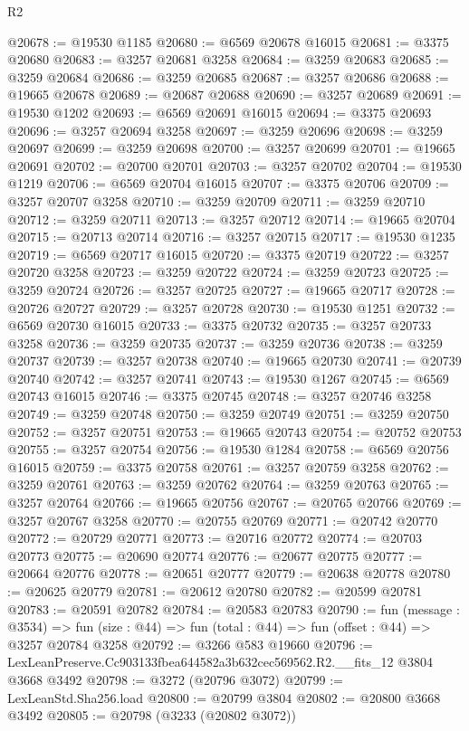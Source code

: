 \begin{lexlean}{R2}
\begin{coremodule}
@20678 := @19530 @1185
@20680 := @6569 @20678 @16015
@20681 := @3375 @20680
@20683 := @3257 @20681 @3258
@20684 := @3259 @20683
@20685 := @3259 @20684
@20686 := @3259 @20685
@20687 := @3257 @20686
@20688 := @19665 @20678
@20689 := @20687 @20688
@20690 := @3257 @20689
@20691 := @19530 @1202
@20693 := @6569 @20691 @16015
@20694 := @3375 @20693
@20696 := @3257 @20694 @3258
@20697 := @3259 @20696
@20698 := @3259 @20697
@20699 := @3259 @20698
@20700 := @3257 @20699
@20701 := @19665 @20691
@20702 := @20700 @20701
@20703 := @3257 @20702
@20704 := @19530 @1219
@20706 := @6569 @20704 @16015
@20707 := @3375 @20706
@20709 := @3257 @20707 @3258
@20710 := @3259 @20709
@20711 := @3259 @20710
@20712 := @3259 @20711
@20713 := @3257 @20712
@20714 := @19665 @20704
@20715 := @20713 @20714
@20716 := @3257 @20715
@20717 := @19530 @1235
@20719 := @6569 @20717 @16015
@20720 := @3375 @20719
@20722 := @3257 @20720 @3258
@20723 := @3259 @20722
@20724 := @3259 @20723
@20725 := @3259 @20724
@20726 := @3257 @20725
@20727 := @19665 @20717
@20728 := @20726 @20727
@20729 := @3257 @20728
@20730 := @19530 @1251
@20732 := @6569 @20730 @16015
@20733 := @3375 @20732
@20735 := @3257 @20733 @3258
@20736 := @3259 @20735
@20737 := @3259 @20736
@20738 := @3259 @20737
@20739 := @3257 @20738
@20740 := @19665 @20730
@20741 := @20739 @20740
@20742 := @3257 @20741
@20743 := @19530 @1267
@20745 := @6569 @20743 @16015
@20746 := @3375 @20745
@20748 := @3257 @20746 @3258
@20749 := @3259 @20748
@20750 := @3259 @20749
@20751 := @3259 @20750
@20752 := @3257 @20751
@20753 := @19665 @20743
@20754 := @20752 @20753
@20755 := @3257 @20754
@20756 := @19530 @1284
@20758 := @6569 @20756 @16015
@20759 := @3375 @20758
@20761 := @3257 @20759 @3258
@20762 := @3259 @20761
@20763 := @3259 @20762
@20764 := @3259 @20763
@20765 := @3257 @20764
@20766 := @19665 @20756
@20767 := @20765 @20766
@20769 := @3257 @20767 @3258
@20770 := @20755 @20769
@20771 := @20742 @20770
@20772 := @20729 @20771
@20773 := @20716 @20772
@20774 := @20703 @20773
@20775 := @20690 @20774
@20776 := @20677 @20775
@20777 := @20664 @20776
@20778 := @20651 @20777
@20779 := @20638 @20778
@20780 := @20625 @20779
@20781 := @20612 @20780
@20782 := @20599 @20781
@20783 := @20591 @20782
@20784 := @20583 @20783
@20790 := fun (message : @3534) =>
  fun (size : @44) => fun (total : @44) => fun (offset : @44) => @3257 @20784 @3258
@20792 := @3266 @583 @19660
@20796 := LexLeanPreserve.Cc903133fbea644582a3b632cec569562.R2.__fits_12 @3804 @3668 @3492
@20798 := @3272 (@20796 @3072)
@20799 := LexLeanStd.Sha256.load
@20800 := @20799 @3804
@20802 := @20800 @3668 @3492
@20805 := @20798 (@3233 (@20802 @3072))

\end{coremodule}
\end{lexlean}
